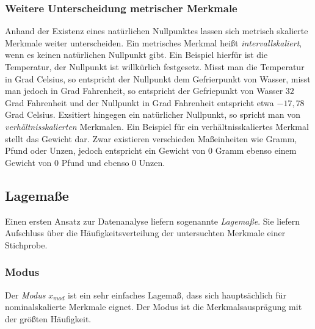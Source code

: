\documentclass[fontsize=11pt]{scrartcl}
\begin{document}
                    \subsubsection{Weitere Unterscheidung metrischer Merkmale}
                        Anhand der Existenz eines natürlichen Nullpunktes lassen sich metrisch skalierte Merkmale weiter unterscheiden. Ein metrisches Merkmal heißt \emph{intervallskaliert}, wenn es keinen natürlichen Nullpunkt gibt. \cite{kohn2005} Ein Beispiel hierfür ist die Temperatur, der Nullpunkt ist willkürlich festgesetz. Misst man die Temperatur in Grad Celsius, so entspricht der Nullpunkt dem Gefrierpunkt von Wasser, misst man jedoch in Grad Fahrenheit, so entspricht der Gefriepunkt von Wasser $32$ Grad Fahrenheit und der Nullpunkt in Grad Fahrenheit entspricht etwa $-17,78$ Grad Celsius.
                        \newline
                        Exsitiert hingegen ein natürlicher Nullpunkt, so spricht man von \emph{verhältnisskalierten} Merkmalen. \cite{kohn2005}
                        \newline
                        Ein Beispiel für ein verhältnisskaliertes Merkmal stellt das Gewicht dar. Zwar existieren verschieden Maßeinheiten wie Gramm, Pfund oder Unzen, jedoch entspricht ein Gewicht von $0$ Gramm ebenso einem Gewicht von $0$ Pfund und ebenso $0$ Unzen.
                
                \subsection{Lagemaße}
                    Einen ersten Ansatz zur Datenanalyse liefern sogenannte \emph{Lagemaße}. Sie liefern Aufschluss über die Häufigkeitsverteilung der untersuchten Merkmale einer Stichprobe. \cite{kohn2005}
                    
                    \subsubsection{Modus}
                        Der \emph{Modus} $x_{mod}$ ist ein sehr einfaches Lagemaß, dass sich hauptsächlich für nominalskalierte Merkmale eignet. Der Modus ist die Merkmalsausprägung mit der größten Häufigkeit. \cite{kohn2005}
                    
\end{document}
